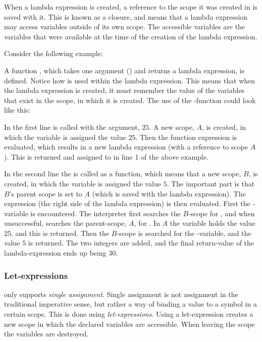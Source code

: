 When a lambda expression is created, a reference to the scope it was created in
is saved with it. This is known as a closure, and means that a lambda
expression may access variables outside of its own scope. The accessible
variables are the variables that were available at the time of the creation of
the lambda expression.

Consider the following example:


A function , which takes one argument () and
returns a lambda expression, is defined. Notice how  is used within
the lambda expression. This means that when the lambda expression is created, it
must remember the value of the variables that exist in the scope, in which it is
created. The use of the -function could look like this:


In the first line  is called with the argument, $25$. A new scope, $A$,
is created, in which the variable  is assigned the value $25$. Then the function
expression is evaluated, which results in a new lambda expression (with a reference to scope $A$).
This is returned and assigned to  in line 1 of the above example.

In the second line the  is called as a function, which means that a new scope, $B$,
is created, in which the variable  is assigned the value $5$. The important part is
that $B$'s parent scope is set to $A$ (which is saved with the lambda expression). The expression
(the right side of the lambda expression) is then evaluated. First the -variable is
encountered. The interpreter first searches the $B$-scope for , and when unsuccessful,
searches the parent-scope, $A$, for . In $A$ the variable  holds the value
$25$, and this is returned. Then the $B$-scope is searched for the -variable, and the value
$5$ is returned. The two integers are added, and the final return-value of the lambda-expression
ends up being $30$.

\subsubsection{Let-expressions}

\productname{} only supports \emph{single assignment}. Single assignment is not assignment
in the traditional imperative sense, but rather a way of binding a value to a symbol in a
certain scope. This is done using \emph{let-expressions}. Using a let-expression creates a
new scope in which the declared variables are accessible. When leaving the scope the
variables are destroyed.

